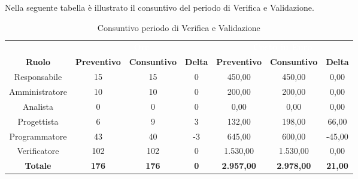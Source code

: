 Nella seguente tabella è illustrato il consuntivo del periodo di Verifica e Validazione.
\begin{table}[H]
\centering
\begin{tabular}{c|ccc|ccc}
\rowcolor{greySWEight}
\multicolumn{1}{c}{} & \multicolumn{3}{c}{\textcolor{white}{\textbf{Ore}}} & \multicolumn{3}{c}{\textcolor{white}{\textbf{Costo in Euro}}} \\
{\textbf{Ruolo}} & {\textbf{Preventivo}} & {\textbf{Consuntivo}} & {\textbf{Delta}} & {\textbf{Preventivo}} & {\textbf{Consuntivo}} & {\textbf{Delta}} \\
Responsabile & 15 & 15 & 0 & 450,00 & 450,00 & 0,00 \\
Amministratore & 10 & 10 & 0 & 200,00 & 200,00 & 0,00 \\
Analista & 0 & 0 & 0 & 0,00 & 0,00 & 0,00 \\
Progettista & 6 & 9 & 3 & 132,00 & 198,00 & 66,00 \\
Programmatore & 43 & 40 & -3 & 645,00 & 600,00 & -45,00 \\
Verificatore & 102 & 102 & 0 & 1.530,00 & 1.530,00 & 0,00 \\
\hline
\textbf{Totale} & \textbf{176} & \textbf{176} & \textbf{0} & \textbf{2.957,00} & \textbf{2.978,00} & \textbf{21,00} \\


\end{tabular}
\caption{Consuntivo periodo di Verifica e Validazione}
\end{table}
